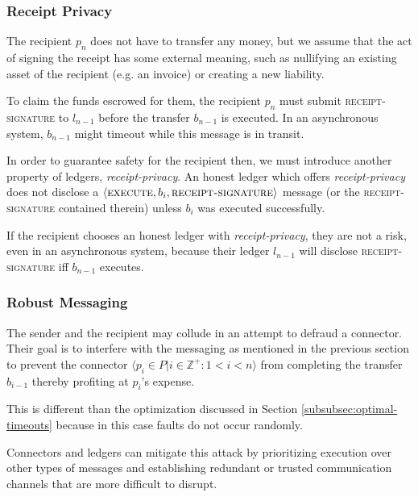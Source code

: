 \documentclass[letterpaper,twocolumn,10pt]{article}
\begin{document}
\subsubsection{Receipt Privacy}

The recipient $p_n$ does not have to transfer any money, but we assume that the act of signing the receipt has some external meaning, such as nullifying an existing asset of the recipient (e.g. an invoice) or creating a new liability.

To claim the funds escrowed for them, the recipient $p_n$ must submit \textsc{receipt-signature} to $l_{n-1}$ before the transfer $b_{n-1}$ is executed. In an asynchronous system, $b_{n-1}$ might timeout while this message is in transit.

In order to guarantee safety for the recipient then, we must introduce another property of ledgers, \textit{receipt-privacy}. An honest ledger which offers \textit{receipt-privacy} does not disclose a $\langle\textsc{execute}, b_i, \textsc{receipt-signature}\rangle$ message (or the \textsc{receipt-signature} contained therein) unless $b_i$ was executed successfully.

If the recipient chooses an honest ledger with \textit{receipt-privacy}, they are not a risk, even in an asynchronous system, because their ledger $l_{n-1}$ will disclose \textsc{receipt-signature} iff $b_{n-1}$ executes.

\subsubsection{Robust Messaging}

The sender and the recipient may collude in an attempt to defraud a connector. Their goal is to interfere with the messaging as mentioned in the previous section to prevent the connector $ \langle p_i \in P | i \in \mathbb{Z}^+ : 1 < i < n \rangle $ from completing the transfer $b_{i-1}$ thereby profiting at $p_i$'s expense.

This is different than the optimization discussed in Section \ref{subsubsec:optimal-timeouts} because in this case faults do not occur randomly.

Connectors and ledgers can mitigate this attack by prioritizing execution over other types of messages and establishing redundant or trusted communication channels that are more difficult to disrupt.




\end{document}
